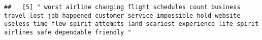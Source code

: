 \documentclass[
]{article}
\begin{document}
\begin{verbatim}
##   [5] " worst airline changing flight schedules count business travel lost job happened customer service impossible hold website useless time flew spirit attempts land scariest experience life spirit airlines safe dependable friendly "                                                                                                                                                                                                                                                                                                                                                                                                                                                                                                                                                                                                                                                                                                                                                                                                                                                                                                                                                                                                                                                                                                                                                                                                                                                                                                                                                                                                                                                                                                                                                           

\end{verbatim}
\end{document}
